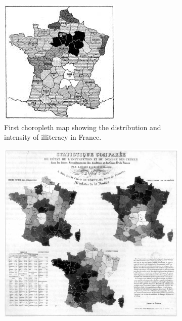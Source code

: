 \cbstart
\begin{figure}[!htb]
  \captionsetup[subfigure]{justification=centering}
  \centering
  \begin{subfigure}[b]{0.4\textwidth}
    \includegraphics[width=\textwidth]{images/history/dupin.jpg}
    \caption{First choropleth map showing the distribution and intensity of illiteracy in France.}
    \label{fig:first-choropleth}
  \end{subfigure}
  \hfill
  \begin{subfigure}[b]{0.4\textwidth}
    \includegraphics[width=\textwidth]{images/history/second-choropleth.jpg}

\end{subfigure}
\end{figure}
